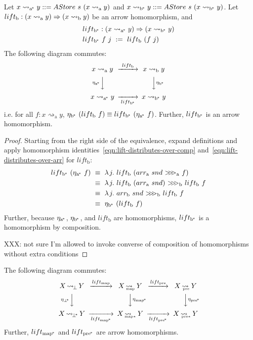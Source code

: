 \documentclass[preprint]{sigplanconf}
\newcommand{\arrow}{\rightsquigarrow}
\newcommand{\arrowlift}{\ensuremath{lift}}
\newcommand{\arrowarr}{\ensuremath{arr}}
\newcommand{\arrowcomp}{\ensuremath{{>}\mspace{-6mu}{>}\mspace{-6mu}{>}}}
\newcommand{\arrowtrans}{\ensuremath{\eta}}
\newcommand{\gen}{_\mathrm{a}}
\newcommand{\genb}{_\mathrm{b}}
\newcommand{\genc}{_\mathrm{a^{\mspace{-2mu}*}}}
\newcommand{\gend}{_\mathrm{b^{\mspace{-2mu}*}}}
\DeclareMathOperator{\botto}{\arrow_{\mspace{-3mu}\bot}}
\newcommand{\map}{_\mathrm{map}}
\DeclareMathOperator{\mapto}{\arrow_{\mspace{-21mu}\map}}
\newcommand{\liftmap}{\arrowlift\map}
\newcommand{\pre}{_\mathrm{pre}}
\DeclareMathOperator{\preto}{\arrow_{\mspace{-19mu}\pre}}
\newcommand{\liftpre}{\arrowlift\pre}
\newcommand{\pbot}{{\bot^{\mspace{-4mu}*}}}
\DeclareMathOperator{\pbotto}{\arrow_{\mspace{-3mu}\pbot}}
\newcommand{\pmap}{_\mathrm{map^{\mspace{-2mu}*}}}
\DeclareMathOperator{\pmapto}{\arrow_{\mspace{-22mu}_{\mathrm{map*}}}}
\newcommand{\liftpmap}{\arrowlift\pmap}
\newcommand{\ppre}{_\mathrm{pre^{\mspace{-2mu}*}}}
\DeclareMathOperator{\ppreto}{\arrow_{\mspace{-19mu}_{\mathrm{pre*}}}}
\newcommand{\liftppre}{\arrowlift\ppre}
\begin{document}
\begin{theorem}
Let $x \arrow\genc y ::= AStore~s~(x \arrow\gen y)$ and $x \arrow\gend y ::= AStore~s~(x \arrow\gend y)$.
Let $\arrowlift\genb : (x \arrow\gen y) \tto (x \arrow\genb y)$ be an arrow homomorphism, and
\begin{equation}
\begin{aligned}
	&\arrowlift\gend : (x \arrow\genc y) \tto (x \arrow\gend y) \\
	&\arrowlift\gend~f~j \ := \ \arrowlift\genb~(f~j)
\end{aligned}
\end{equation}
The following diagram commutes:
\begin{equation}
\begin{CD}
	x \arrow\gen y @>{\arrowlift\genb}>> x \arrow\genb y \\
	@V{\arrowtrans\genc}VV   @VV{\arrowtrans\gend}V \\
	x \arrow\genc y @>>{\arrowlift\gend}> x \arrow\gend y
\end{CD}
\end{equation}
i.e. for all $f : x \arrow\gen y$, $\arrowtrans\gend~(\arrowlift\genb~f) \equiv \arrowlift\gend~(\arrowtrans\genc~f)$.
Further, $\arrowlift\gend$ is an arrow homomorphism.
\end{theorem}
\begin{proof}
Starting from the right side of the equivalence, expand definitions and apply homomorphism identities~\eqref{eqn:lift-distributes-over-comp} and~\eqref{eqn:lift-distributes-over-arr} for $\arrowlift\genb$:
\begin{align*}
	\arrowlift\gend~(\arrowtrans\genc~f)
	&\ \equiv\ \fun{j}{\arrowlift\genb~(\arrowarr\gen~snd~\arrowcomp\gen~f)}
\\
	&\ \equiv\ \fun{j}{\arrowlift\genb~(\arrowarr\gen~snd)~\arrowcomp\genb~\arrowlift\genb~f}
\\
	&\ \equiv\ \fun{j}{\arrowarr\genb~snd~\arrowcomp\genb~\arrowlift\genb~f}
\\
	&\ \equiv\ \arrowtrans\gend~(\arrowlift\genb~f)
\end{align*}
Further, because $\arrowtrans\genc$, $\arrowtrans\gend$, and $\arrowlift\genb$ are homomorphisms, $\arrowlift\gend$ is a homomorphism by composition.

XXX: not sure I'm allowed to invoke converse of composition of homomorphisms without extra conditions
\end{proof}

\begin{corollary}
The following diagram commutes:
\begin{equation}
\begin{CD}
X \botto Y   @>\liftmap>>   X \mapto Y   @>\liftpre>>   X \preto Y \\
@V{\eta_\pbot}VV             @VV{\eta\pmap}V              @VV{\eta\ppre}V\\
X \pbotto Y  @>>\liftpmap>  X \pmapto Y  @>>\liftppre>  X \ppreto Y
\end{CD}
\end{equation}
Further, $\liftpmap$ and $\liftppre$ are arrow homomorphisms.
\end{corollary}
\end{document}
